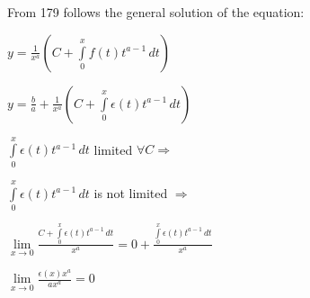 \documentclass{article}
\begin{document}
From 179 follows the general solution of the equation:
\begin{center}
\begin{spacing}{3}
$\displaystyle y= \frac{1}{x^a} (C+\int\limits _0^x f(t)t^{a-1}\,dt)$

$\displaystyle y= \frac{b}{a}+\frac{1}{x^a} (C+\int\limits _0^x \epsilon(t)t^{a-1}\,dt)$

$\displaystyle \int\limits _0^x \epsilon(t)t^{a-1}\,dt$  limited $\forall C \Rightarrow$ 

$\displaystyle \int\limits _0^x \epsilon(t)t^{a-1}\,dt$  is not limited $\Rightarrow$

$\displaystyle \lim\limits_{x \to 0}\frac{C+\int\limits _0^x \epsilon(t)t^{a-1}\,dt}{x^a}=0+\frac{\int\limits _0^x \epsilon(t)t^{a-1}\,dt}{x^a}$

$\displaystyle \lim\limits_{x \to 0}\frac{\epsilon(x)x^a}{ax^a}=0$

\end{spacing}
\end{center}
\end{document}
